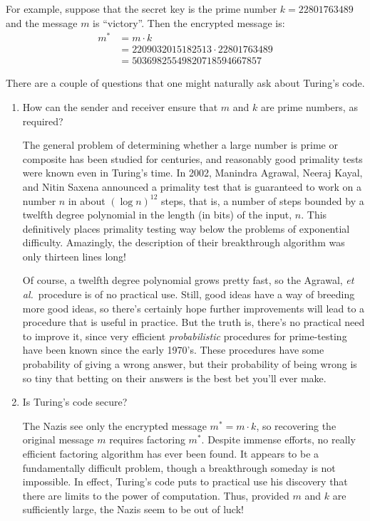 For example, suppose that the secret key is the prime number $k =
22801763489$ and the message $m$ is ``victory''.  Then the encrypted
message is:
%
\begin{align*}
m^* & = m \cdot k \\
   & = 2209032015182513 \cdot 22801763489 \\
   & = 50369825549820718594667857
\end{align*}

There are a couple of questions that one might naturally ask about Turing's
code.

\begin{enumerate}

\item How can the sender and receiver ensure that $m$ and $k$ are
prime numbers, as required?

The general problem of determining whether a large number is prime or
composite has been studied for centuries, and reasonably good primality
tests were known even in Turing's time.  In 2002, Manindra Agrawal, Neeraj
Kayal, and Nitin Saxena announced a primality test that is guaranteed to
work on a number $n$ in about $(\log n)^{12}$ steps, that is, a number of
steps bounded by a twelfth degree polynomial in the length (in bits) of
the input, $n$.  This definitively places primality testing way below the
problems of exponential difficulty.  Amazingly, the description of their
breakthrough algorithm was only thirteen lines long!

Of course, a twelfth degree polynomial grows pretty fast, so the
Agrawal,\emph{ et al.}\ procedure is of no practical use.  Still, good
ideas have a way of breeding more good ideas, so there's certainly hope
further improvements will lead to a procedure that is useful in practice.
But the truth is, there's no practical need to improve it, since very
efficient \emph{probabilistic} procedures for prime-testing have been
known since the early 1970's.  These procedures have some probability of
giving a wrong answer, but their probability of being wrong is so tiny
that betting on their answers is the best bet you'll ever make.

\item Is Turing's code secure?

The Nazis see only the encrypted message $m^* = m \cdot k$, so
recovering the original message $m$ requires factoring $m^*$.  Despite
immense efforts, no really efficient factoring algorithm has ever been
found.  It appears to be a fundamentally difficult problem, though a
breakthrough someday is not impossible.  In effect, Turing's code puts
to practical use his discovery that there are limits to the power of
computation.  Thus, provided $m$ and $k$ are sufficiently large, the
Nazis seem to be out of luck!

\end{enumerate}


